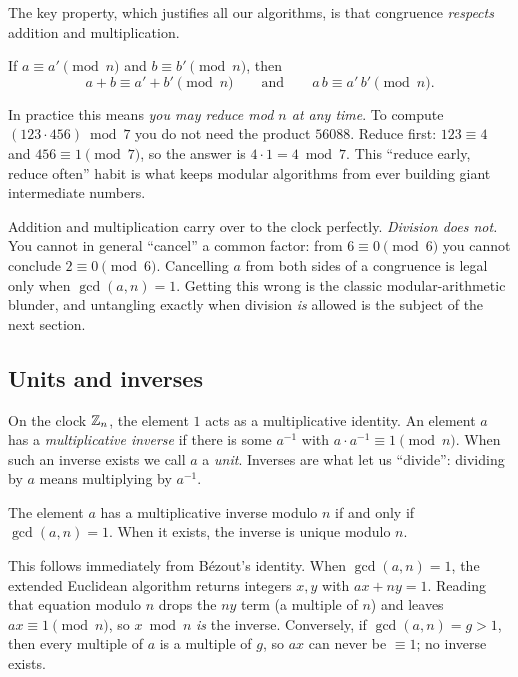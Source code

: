 The key property, which justifies all our algorithms, is that congruence
\emph{respects} addition and multiplication.

\begin{theorem}
\label{ch30:thm-respect}
If $a \equiv a' \pmod n$ and $b \equiv b' \pmod n$, then
\[
  a + b \equiv a' + b' \pmod n
  \qquad\text{and}\qquad
  a\,b \equiv a'\,b' \pmod n.
\]
\end{theorem}

In practice this means \emph{you may reduce mod $n$ at any time}.
To compute $(123 \cdot 456) \bmod 7$ you do not need the product $56088$. Reduce
first: $123 \equiv 4$ and $456 \equiv 1 \pmod 7$, so the answer is $4 \cdot 1 = 4
\bmod 7$. This ``reduce early, reduce often'' habit is what keeps modular
algorithms from ever building giant intermediate numbers.

\begin{trapbox}
Addition and multiplication carry over to the clock perfectly. \emph{Division
does not.} You cannot in general ``cancel'' a common factor: from $6 \equiv 0
\pmod 6$ you cannot conclude $2 \equiv 0 \pmod 6$. Cancelling $a$ from both sides
of a congruence is legal only when $\gcd(a,n) = 1$. Getting this wrong is the
classic modular-arithmetic blunder, and untangling exactly when division
\emph{is} allowed is the subject of the next section.
\end{trapbox}

\subsection{Units and inverses}

On the clock $\mathbb{Z}_n$, the element $1$ acts as a multiplicative identity. An
element $a$ has a \emph{multiplicative inverse} if there is some $a^{-1}$ with
$a \cdot a^{-1} \equiv 1 \pmod n$. When such an inverse exists we call $a$ a
\emph{unit}. Inverses are what let us ``divide'': dividing by $a$ means
multiplying by $a^{-1}$.

\begin{theorem}
\label{ch30:thm-inverse}
The element $a$ has a multiplicative inverse modulo $n$ if and only if
$\gcd(a,n) = 1$. When it exists, the inverse is unique modulo $n$.
\end{theorem}

\begin{intuitionbox}
This follows immediately from B\'ezout's identity. When $\gcd(a,n) = 1$,
the extended Euclidean algorithm returns integers $x, y$ with $ax + ny = 1$.
Reading that equation modulo $n$ drops the $ny$ term (a multiple of $n$) and
leaves $a x \equiv 1 \pmod n$, so $x \bmod n$ \emph{is} the inverse. Conversely, if $\gcd(a,n) = g > 1$, then every multiple of $a$ is a
multiple of $g$, so $ax$ can never be $\equiv 1$; no inverse exists.
\end{intuitionbox}

